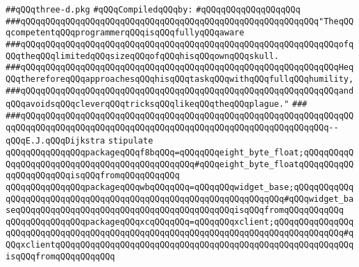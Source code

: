 \label{src/lib/x-kit/widget/old/lib/three-d.pkg}
\verb|##qQQqthree-d.pkg|\newline
\newline
\verb|#qQQqCompiledqQQqby:|\newline
\verb|#qQQqqQQqqQQqqQQqqQQq|\newline
\newline
\newline
\newline
\verb|###qQQqqQQqqQQqqQQqqQQqqQQqqQQqqQQqqQQqqQQqqQQqqQQqqQQqqQQqqQQq"TheqQQqcompetentqQQqprogrammerqQQqisqQQqfullyqQQqaware|\newline
\verb|###qQQqqQQqqQQqqQQqqQQqqQQqqQQqqQQqqQQqqQQqqQQqqQQqqQQqqQQqqQQqqQQqofqQQqtheqQQqlimitedqQQqsizeqQQqofqQQqhisqQQqownqQQqskull.|\newline
\verb|###qQQqqQQqqQQqqQQqqQQqqQQqqQQqqQQqqQQqqQQqqQQqqQQqqQQqqQQqqQQqqQQqHeqQQqthereforeqQQqapproachesqQQqhisqQQqtaskqQQqwithqQQqfullqQQqhumility,|\newline
\verb|###qQQqqQQqqQQqqQQqqQQqqQQqqQQqqQQqqQQqqQQqqQQqqQQqqQQqqQQqqQQqqQQqandqQQqavoidsqQQqcleverqQQqtricksqQQqlikeqQQqtheqQQqplague."|\newline
\verb|###|\newline
\verb|###qQQqqQQqqQQqqQQqqQQqqQQqqQQqqQQqqQQqqQQqqQQqqQQqqQQqqQQqqQQqqQQqqQQqqQQqqQQqqQQqqQQqqQQqqQQqqQQqqQQqqQQqqQQqqQQqqQQqqQQqqQQqqQQqqQQq--qQQqE.J.qQQqDijkstra|\newline
\newline
\newline
\verb|stipulate|\newline
\verb|qQQqqQQqqQQqqQQqpackageqQQqf8bqQQq=qQQqqQQqeight_byte_float;qQQqqQQqqQQqqQQqqQQqqQQqqQQqqQQqqQQqqQQqqQQqqQQq#qQQqeight_byte_floatqQQqqQQqqQQqqQQqqQQqqQQqisqQQqfromqQQqqQQqqQQq|\newline
\verb|qQQqqQQqqQQqqQQqpackageqQQqwbqQQqqQQq=qQQqqQQqwidget_base;qQQqqQQqqQQqqQQqqQQqqQQqqQQqqQQqqQQqqQQqqQQqqQQqqQQqqQQqqQQqqQQqqQQq#qQQqwidget_baseqQQqqQQqqQQqqQQqqQQqqQQqqQQqqQQqqQQqqQQqqQQqisqQQqfromqQQqqQQqqQQq|\newline
\verb|qQQqqQQqqQQqqQQqpackageqQQqxcqQQqqQQq=qQQqqQQqxclient;qQQqqQQqqQQqqQQqqQQqqQQqqQQqqQQqqQQqqQQqqQQqqQQqqQQqqQQqqQQqqQQqqQQqqQQqqQQqqQQqqQQq#qQQqxclientqQQqqQQqqQQqqQQqqQQqqQQqqQQqqQQqqQQqqQQqqQQqqQQqqQQqqQQqqQQqisqQQqfromqQQqqQQqqQQq|\newline
